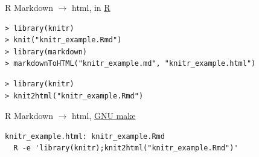 \documentclass[12pt,t]{beamer}
\begin{document}
\begin{frame}[fragile]{R Markdown $\rightarrow$ html, in \href{http://www.r-project.org}{R}}

\vspace{18pt}

\begin{lstlisting}
> library(knitr)
> knit("knitr_example.Rmd")
> library(markdown)
> markdownToHTML("knitr_example.md", "knitr_example.html")
\end{lstlisting}

\bigskip

\begin{lstlisting}
> library(knitr)
> knit2html("knitr_example.Rmd")
\end{lstlisting}


\end{frame}

\begin{frame}[fragile]{R Markdown $\rightarrow$ html,
    \href{http://www.gnu.org/software/make}{GNU make}}

\vspace{24pt}

\begin{lstlisting}
knitr_example.html: knitr_example.Rmd
  R -e 'library(knitr);knit2html("knitr_example.Rmd")'
\end{lstlisting}

\end{frame}
\end{document}
